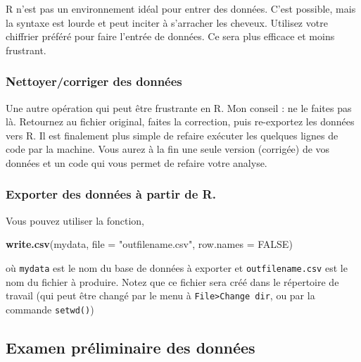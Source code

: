 \documentclass[12pt,]{book}
\newenvironment{Shaded}{\begin{snugshade}}{\end{snugshade}}
\newcommand{\DataTypeTok}[1]{\textcolor[rgb]{0.27,0.27,0.27}{#1}}
\newcommand{\KeywordTok}[1]{\textcolor[rgb]{0.27,0.27,0.27}{\textbf{#1}}}
\newcommand{\NormalTok}[1]{#1}
\newcommand{\OtherTok}[1]{\textcolor[rgb]{0.37,0.37,0.37}{#1}}
\newcommand{\StringTok}[1]{\textcolor[rgb]{0.5,0.5,0.5}{#1}}
\begin{document}
R n'est pas un environnement idéal pour entrer des données.
C'est possible, mais la syntaxe est lourde et peut inciter à s'arracher les cheveux.
Utilisez votre chiffrier préféré pour faire l'entrée de données.
Ce sera plus efficace et moins frustrant.

\hypertarget{nettoyercorriger-des-donnuxe9es}{%
\subsubsection{Nettoyer/corriger des données}\label{nettoyercorriger-des-donnuxe9es}}

Une autre opération qui peut être frustrante en R.
Mon conseil : ne le faites pas là.
Retournez au fichier original, faites la correction, puis re-exportez les données vers R.
Il est finalement plus simple de refaire exécuter les quelques lignes de code par la machine.
Vous aurez à la fin une seule version (corrigée) de vos données et un code qui vous permet de refaire votre analyse.

\hypertarget{exporter-des-donnuxe9es-uxe0-partir-de-r.}{%
\subsubsection{Exporter des données à partir de R.}\label{exporter-des-donnuxe9es-uxe0-partir-de-r.}}

Vous pouvez utiliser la fonction,

\begin{Shaded}
\begin{Highlighting}[]
  \KeywordTok{write.csv}\NormalTok{(mydata, }\DataTypeTok{file =} \StringTok{"outfilename.csv"}\NormalTok{, }\DataTypeTok{row.names =} \OtherTok{FALSE}\NormalTok{)}
\end{Highlighting}
\end{Shaded}

où \texttt{mydata} est le nom du base de données à exporter et \texttt{outfilename.csv} est le nom du fichier à produire.
Notez que ce fichier sera créé dans le répertoire de travail (qui peut être changé par le menu à \texttt{File\textgreater{}Change\ dir}, ou par la commande \texttt{setwd()})

\hypertarget{examen-pruxe9liminaire-des-donnuxe9es}{%
\subsection{Examen préliminaire des données}\label{examen-pruxe9liminaire-des-donnuxe9es}}
\end{document}

